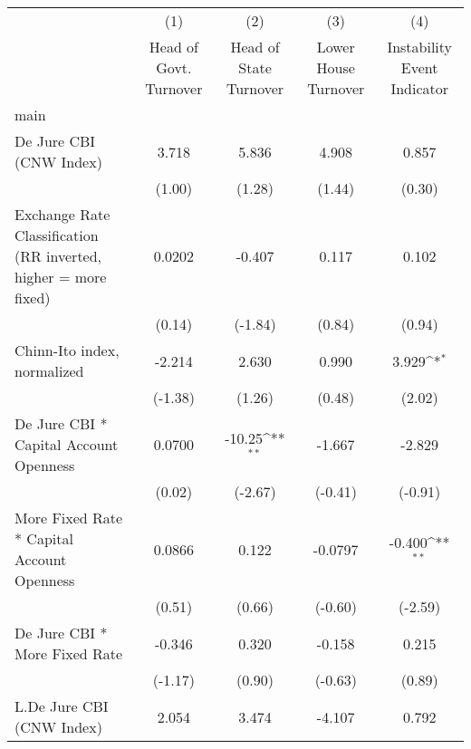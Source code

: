 {
\def\sym#1{\ifmmode^{#1}\else\(^{#1}\)\fi}
\begin{longtable}{l*{4}{c}}
\hline\hline\endfirsthead\hline\endhead\hline\endfoot\endlastfoot
                &\multicolumn{1}{c}{(1)}&\multicolumn{1}{c}{(2)}&\multicolumn{1}{c}{(3)}&\multicolumn{1}{c}{(4)}\\
                &\multicolumn{1}{c}{Head of Govt. Turnover}&\multicolumn{1}{c}{Head of State Turnover}&\multicolumn{1}{c}{Lower House Turnover}&\multicolumn{1}{c}{Instability Event Indicator}\\
\hline
main            &                  &                  &                  &                  \\
De Jure CBI (CNW Index)&    3.718         &    5.836         &    4.908         &    0.857         \\
                &   (1.00)         &   (1.28)         &   (1.44)         &   (0.30)         \\
[1em]
Exchange Rate Classification (RR inverted, higher = more fixed)&   0.0202         &   -0.407         &    0.117         &    0.102         \\
                &   (0.14)         &  (-1.84)         &   (0.84)         &   (0.94)         \\
[1em]
Chinn-Ito index, normalized&   -2.214         &    2.630         &    0.990         &    3.929\sym{*}  \\
                &  (-1.38)         &   (1.26)         &   (0.48)         &   (2.02)         \\
[1em]
De Jure CBI * Capital Account Openness&   0.0700         &   -10.25\sym{**} &   -1.667         &   -2.829         \\
                &   (0.02)         &  (-2.67)         &  (-0.41)         &  (-0.91)         \\
[1em]
More Fixed Rate * Capital Account Openness&   0.0866         &    0.122         &  -0.0797         &   -0.400\sym{**} \\
                &   (0.51)         &   (0.66)         &  (-0.60)         &  (-2.59)         \\
[1em]
De Jure CBI * More Fixed Rate&   -0.346         &    0.320         &   -0.158         &    0.215         \\
                &  (-1.17)         &   (0.90)         &  (-0.63)         &   (0.89)         \\
[1em]
L.De Jure CBI (CNW Index)&    2.054         &    3.474         &   -4.107         &    0.792         \\

\end{longtable}}
